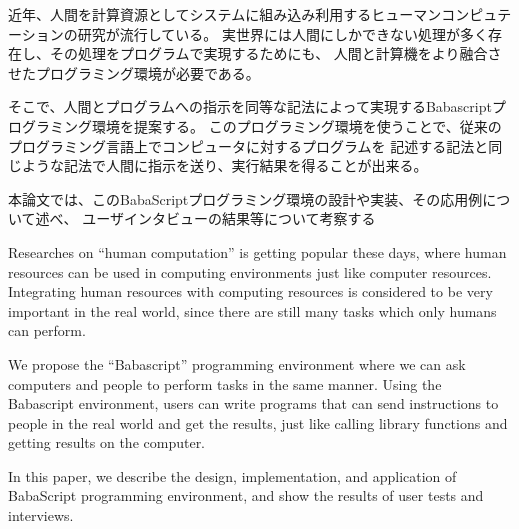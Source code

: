 \begin{jabstract}

近年、人間を計算資源としてシステムに組み込み利用するヒューマンコンピュテーションの研究が流行している。
実世界には人間にしかできない処理が多く存在し、その処理をプログラムで実現するためにも、
人間と計算機をより融合させたプログラミング環境が必要である。

そこで、人間とプログラムへの指示を同等な記法によって実現するBabascriptプログラミング環境を提案する。
このプログラミング環境を使うことで、従来のプログラミング言語上でコンピュータに対するプログラムを
記述する記法と同じような記法で人間に指示を送り、実行結果を得ることが出来る。

本論文では、このBabaScriptプログラミング環境の設計や実装、その応用例について述べ、
ユーザインタビューの結果等について考察する

\end{jabstract}

\begin{eabstract}

Researches on ``human computation'' is getting popular these days,
where human resources can be used in computing environments just like
computer resources. Integrating human resources with computing
resources is considered to be very important in the real world, since
there are still many tasks which only humans can perform.

We propose the ``Babascript'' programming environment where we can ask
computers and people to perform tasks in the same manner.  Using the
Babascript environment, users can write programs that can send
instructions to people in the real world and get the results, just
like calling library functions and getting results on the computer.

In this paper, we describe the design, implementation, and application
of BabaScript programming environment, and show the results of
user tests and interviews.

\end{eabstract}
